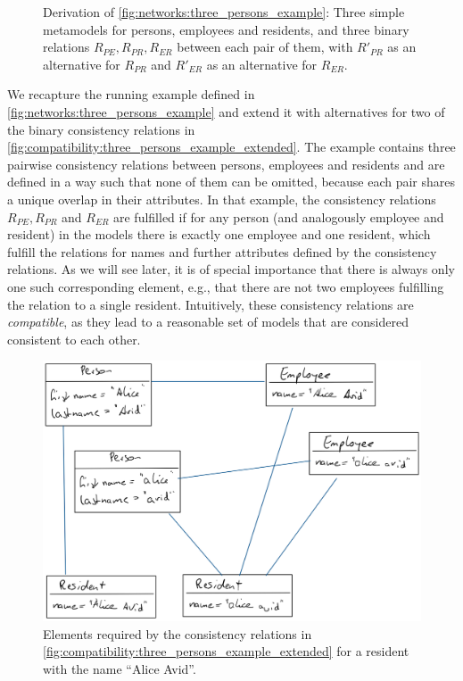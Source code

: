 \begin{figure}
    \centering
    
    \caption[Three metamodels with (in)compatible consistency relations]{Derivation of \autoref{fig:networks:three_persons_example}: Three simple metamodels for persons, employees and residents, and three binary relations $R_{PE}, R_{PR}, R_{ER}$ between each pair of them, with $R'_{PR}$ as an alternative for $R_{PR}$ and $R'_{ER}$ as an alternative for $R_{ER}$.}
    \label{fig:compatibility:three_persons_example_extended}
\end{figure}

We recapture the running example defined in \autoref{fig:networks:three_persons_example} and extend it with alternatives for two of the binary consistency relations in \autoref{fig:compatibility:three_persons_example_extended}.
The example contains three pairwise consistency relations between persons, employees and residents and are defined in a way such that none of them can be omitted, because each pair shares a unique overlap in their attributes.
In that example, the consistency relations $R_{PE}, R_{PR}$ and $R_{ER}$ are fulfilled if for any person (and analogously employee and resident) in the models there is exactly one employee and one resident, which fulfill the relations for names and further attributes defined by the consistency relations.
As we will see later, it is of special importance that there is always only one such corresponding element, e.g., that there are not two employees fulfilling the relation to a single resident.
Intuitively, these consistency relations are \emph{compatible}, as they lead to a reasonable set of models that are considered consistent to each other.

\begin{figure}
    \centering
    \includegraphics[width=\textwidth]{figures/correctness/compatibility/intuitive_incompatibility.png}
    \caption[Example for an intuitive notion of incompatibility]{Elements required by the consistency relations in \autoref{fig:compatibility:three_persons_example_extended} for a resident with the name \enquote{Alice Avid}.}
    \label{fig:compatibility:intuitive_incompatibility}
\end{figure}

